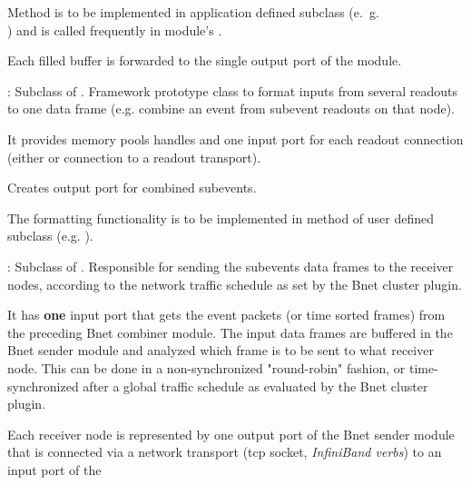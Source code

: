 \begin{description}
\begin{compactenum}
  \item Method  is to be implemented in application 
      defined subclass (e.~g.~ \\
      ) and is called frequently 
      in module's . 
  \item Each filled buffer is forwarded to the single output port of the module. 
\end{compactenum}
\item[\class{bnet::CombinerModule}] :  
   Subclass of . 
   Framework prototype class to format inputs from several readouts to one data 
   frame (e.g. combine an event from subevent readouts on that node). 
\begin{compactenum}
  \item It provides memory pools handles and one input port for each 
      readout connection \\
      (either  or connection to a 
      readout transport). 
  \item Creates output port for combined subevents.    
  \item The formatting functionality is to be implemented in method 
       of user defined subclass (e.g. ).
\end{compactenum}
\item[\class{bnet::SenderModule}] : 
Subclass of . 
   Responsible for sending the subevents data frames to the receiver 
   nodes, according to the network traffic schedule as set by the Bnet cluster plugin.
\begin{compactenum}
  \item It has {\bf one} input port that gets the event packets 
      (or time sorted frames) from the preceding Bnet combiner module. 
      The input data frames are buffered in the Bnet sender module and analyzed 
      which frame is to be sent to what receiver node. 
      This can be done in a non-synchronized "round-robin" fashion, 
      or time-synchronized after a global traffic schedule as evaluated by 
      the Bnet cluster plugin.  
  \item Each receiver node is represented by one output port of 
      the Bnet sender module that is connected via a network transport 
      (tcp socket, {\em InfiniBand verbs}) to an input port of the 

\end{compactenum}
\end{description}

